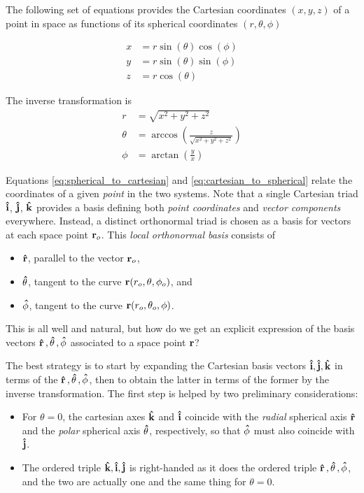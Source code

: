 The following set of equations provides the Cartesian coordinates $(x, y, z)$ of a point in space as functions of its spherical coordinates $(r, \theta, \phi)$ 

\begin{equation}
\label{eq:spherical_to_cartesian}
\begin{aligned}
x &= r \sin (\theta) \cos (\phi) \\
y &= r \sin (\theta) \sin (\phi) \\
z &= r \cos (\theta)
\end{aligned}
\end{equation}

The inverse transformation is 
\begin{equation}
\label{eq:cartesian_to_spherical}
\begin{aligned}
r      &= \sqrt{x^2 + y^2 + z^2} \\
\theta &= \arccos (\frac{z}{\sqrt{x^2 + y^2 + z^2}}) \\
\phi   &= \arctan (\frac{y}{x})
\end{aligned}
\end{equation}

Equations \ref{eq:spherical_to_cartesian} and \ref{eq:cartesian_to_spherical} relate the coordinates of a given \textit{point} in the two systems. Note that a single Cartesian triad $\vu{i}$, $\vu{j}$, $\vu{k}$ provides a basis defining both \textit{point coordinates} and \textit{vector components} everywhere. Instead, a distinct orthonormal triad is chosen as a basis for vectors at each space point $\vb{r}_o$. This \textit{local orthonormal basis} consists of
\begin{itemize}
\item $\vu{r}$, parallel to the vector $\vb{r}_o$,
\item $\vu{\theta}$, tangent to the curve $\vb{r}(r_o, \theta, \phi_o)$, and 
\item $\vu{\phi}$, tangent to the curve $\vb{r}(r_o, \theta_o, \phi)$.
\end{itemize}

This is all well and natural, but how do we get an explicit expression of the basis vectors $\vu{r}\,, \vu{\theta}\,, \vu{\phi}$ associated to a space point $\vb{r}$?   

The best strategy is to start by expanding the Cartesian basis vectors $\vu{i}, \vu{j}, \vu{k}$ in terms of the $\vu{r}\,, \vu{\theta}\,, \vu{\phi}$, then to obtain the latter in terms of the former by the inverse transformation. The first step is helped by two preliminary considerations:    
\begin{itemize}
\item For $\theta=0$, the cartesian axes $\vu{k}$ and $\vu{i}$ coincide with the \textit{radial} spherical axis $\vu{r}$ and the \textit{polar} spherical axis $\vu{\theta}$, respectively, so that $\vu{\phi}$ must also coincide with $\vu{j}$. 
\item The ordered triple $\vu{k}, \vu{i}, \vu{j}$ is right-handed as it does the ordered triple $\vu{r}\,, \vu{\theta}\,, \vu{\phi}$, and the two are actually one and the same thing for $\theta=0$. 
\end{itemize}

